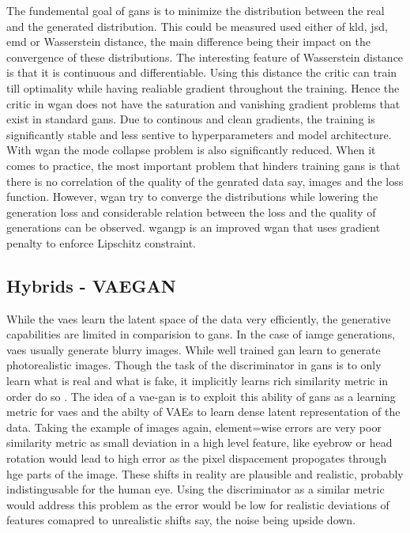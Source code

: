 

The fundemental goal of \acp{gan} is to minimize the distribution between the real and the generated distribution. This could be measured used either of \ac{kld}, \ac{jsd}, \ac{emd} or Wasserstein distance, the main difference being their impact on the convergence of these distributions. The interesting feature of Wasserstein distance is that it is continuous and differentiable. Using this distance the critic can train till optimality while having realiable gradient throughout the training. Hence the critic in \ac{wgan} does not have the saturation and vanishing gradient problems that exist in standard \acp{gan}. Due to continous and clean gradients, the training is significantly stable and less sentive to hyperparameters and model architecture. With \ac{wgan} the mode collapse problem is also significantly reduced. When it comes to practice, the most important problem that hinders training \acp{gan} is that there is no correlation of the quality of the genrated data say, images and the loss function. However, \ac{wgan} try to converge the distributions while lowering the generation loss and considerable relation between the loss and the quality of generations can be observed. \ac{wgangp} \cite{wgangp} is an improved \ac{wgan} that uses gradient penalty to enforce Lipschitz constraint.


\subsection{Hybrids - VAEGAN}
While the \acp{vae} learn the latent space of the data very efficiently, the generative capabilities are limited in comparision to \acp{gan}. In the case of iamge generations, \acp{vae} usually generate blurry images. While well trained \ac{gan} learn to generate photorealistic images. Though the task of the discriminator in \acp{gan} is to only learn what is real and what is fake, it implicitly learns rich similarity metric in order do so \cite{autoencoding_beyond_pixels}. The idea of a \ac{vae}-\ac{gan} is to exploit this ability of \acp{gan} as a learning metric for \acp{vae} and the abilty of \acp{VAE} to learn dense latent representation of the data. Taking the example of images again, element=wise errors are very poor similarity metric as small deviation in a high level feature, like eyebrow or head rotation would lead to high error as the pixel dispacement propogates through hge parts of the image. These shifts in reality are plausible and realistic, probably indistingusable for the human eye. Using the discriminator as a similar metric would address this problem as the error would be low for realistic deviations of features comapred to unrealistic shifts say, the noise being upside down.


